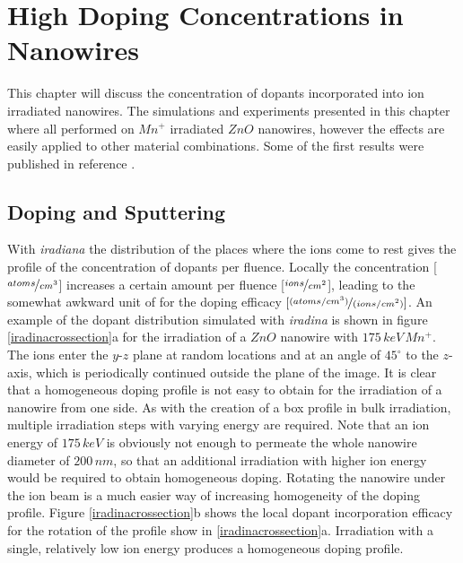 \chapter{High Doping Concentrations in Nanowires}
\label{sec:high}

This chapter will discuss the concentration of dopants incorporated into ion irradiated nanowires. The simulations and experiments presented in this chapter where all performed on $Mn^+$ irradiated $ZnO$ nanowires, however the effects are easily applied to other material combinations. Some of the first results were published in reference \cite{johannes_enhanced_2014}.

\section{Doping and Sputtering}

With \emph{iradiana} the distribution of the places where the ions come to rest gives the profile of the concentration of dopants per fluence. Locally the concentration [$\nicefrac{atoms}{cm^{3}}$] increases a certain amount per fluence [$\nicefrac{ions}{cm^{2}}$], leading to the somewhat awkward unit of for the doping efficacy $[\nicefrac{(atoms/cm^{3})}{(ions/cm^{2})}]$. An example of the dopant distribution simulated with \emph{iradina} is shown in figure \ref{iradinacrossection}a for the irradiation of a $ZnO$ nanowire with $175\,keV\,Mn^+$. The ions enter the $y$-$z$ plane at random locations and at an angle of $45^\circ$ to the $z$-axis, which is periodically continued outside the plane of the image. It is clear that a homogeneous doping profile is not easy to obtain for the irradiation of a nanowire from one side. As with the creation of a box profile in bulk irradiation, multiple irradiation steps with varying energy are required. Note that an ion energy of $175\,keV$ is obviously not enough to permeate the whole nanowire diameter of $200\,nm$, so that an additional irradiation with higher ion energy would be required to obtain homogeneous doping. Rotating the nanowire under the ion beam is a much easier way of increasing homogeneity of the doping profile. Figure \ref{iradinacrossection}b shows the local dopant incorporation efficacy for the rotation of the profile show in \ref{iradinacrossection}a. Irradiation with a single, relatively low ion energy produces a homogeneous doping profile. 
  
